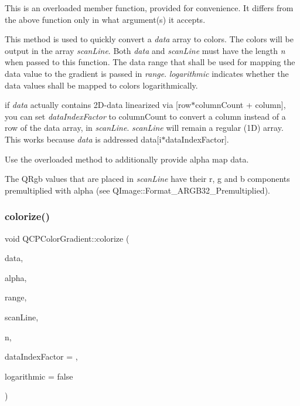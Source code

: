 This is an overloaded member function, provided for convenience. It differs from the above function only in what argument(s) it accepts.

This method is used to quickly convert a {\itshape data} array to colors. The colors will be output in the array {\itshape scan\+Line}. Both {\itshape data} and {\itshape scan\+Line} must have the length {\itshape n} when passed to this function. The data range that shall be used for mapping the data value to the gradient is passed in {\itshape range}. {\itshape logarithmic} indicates whether the data values shall be mapped to colors logarithmically.

if {\itshape data} actually contains 2D-\/data linearized via {\ttfamily \mbox{[}row$\ast$column\+Count + column\mbox{]}}, you can set {\itshape data\+Index\+Factor} to {\ttfamily column\+Count} to convert a column instead of a row of the data array, in {\itshape scan\+Line}. {\itshape scan\+Line} will remain a regular (1D) array. This works because {\itshape data} is addressed {\ttfamily data\mbox{[}i$\ast$data\+Index\+Factor\mbox{]}}.

Use the overloaded method to additionally provide alpha map data.

The Q\+Rgb values that are placed in {\itshape scan\+Line} have their r, g and b components premultiplied with alpha (see Q\+Image\+::\+Format\+\_\+\+A\+R\+G\+B32\+\_\+\+Premultiplied). \mbox{\label{class_q_c_p_color_gradient_acf0cc7fba83ef21f7b8d5d5258519db3}} 
\subsubsection{\texorpdfstring{colorize()}{colorize()}\hspace{0.1cm}{\footnotesize\ttfamily [2/2]}}
{\footnotesize\ttfamily void Q\+C\+P\+Color\+Gradient\+::colorize (\begin{DoxyParamCaption}\item[{const double $\ast$}]{data,  }\item[{const unsigned char $\ast$}]{alpha,  }\item[{const \mbox{\hyperlink{class_q_c_p_range}{Q\+C\+P\+Range}} \&}]{range,  }\item[{Q\+Rgb $\ast$}]{scan\+Line,  }\item[{int}]{n,  }\item[{int}]{data\+Index\+Factor = {},  }\item[{bool}]{logarithmic = {\ttfamily false} }\end{DoxyParamCaption})}

